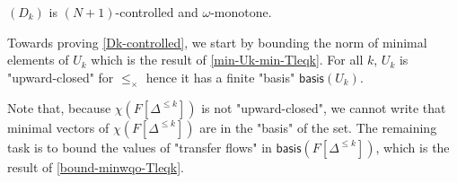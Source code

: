 \documentclass[10pt,a4paper]{article}
\renewcommand{\leq}{\leqslant}
\newcommand{\transitions}{\Delta}
\newcommand*{\minwqo}[1]{\mathsf{basis}(#1)}
\newcommand*{\transfersof}[1]{F[#1]}
\newcommand{\Tleq}[1]{\transfersof{\transitions^{\leq #1}}}
\newcommand*{\leprod}{\leq_{\times}}
\newcommand*{\mapencoding}{\chi}
\begin{document}
\begin{lemmarep}
	\label{Dk-controlled}
	\((D_k)\) is \((N+1)\)-controlled and \(\omega\)-monotone.
\end{lemmarep}
%
%
%
\begin{appendixproof}
	Towards proving \cref{Dk-controlled}, we start by bounding the norm of minimal elements of \(U_k\) which is the result of \cref{min-Uk-min-Tleqk}.
	For all \(k\), \(U_k\) is "upward-closed" for \(\leprod\) hence it has a finite "basis" \(\minwqo{U_k}\).

	Note that, because \(\mapencoding(\Tleq{k})\) is not "upward-closed", we cannot write that minimal vectors of \(\mapencoding(\Tleq{k})\) are in the "basis" of the set.
	The remaining task is to bound the values of "transfer flows" in \(\minwqo{\Tleq{k}}\), which is the result of \cref{bound-minwqo-Tleqk}.


\end{appendixproof}
\end{document}

